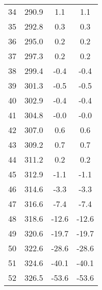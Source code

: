 \begin{tabular}{S[table-format=2.0]S[table-format=3.1]S[table-format=2.1]S[table-format=2.1]}
		34 & 290.9 & 1.1 & 1.1 \\
		35 & 292.8 & 0.3 & 0.3 \\
		36 & 295.0 & 0.2 & 0.2 \\
		37 & 297.3 & 0.2 & 0.2 \\
		38 & 299.4 & -0.4 & -0.4 \\
		39 & 301.3 & -0.5 & -0.5 \\
		40 & 302.9 & -0.4 & -0.4 \\
		41 & 304.8 & -0.0 & -0.0 \\
		42 & 307.0 & 0.6 & 0.6 \\
		43 & 309.2 & 0.7 & 0.7 \\
		44 & 311.2 & 0.2 & 0.2 \\
		45 & 312.9 & -1.1 & -1.1 \\
		46 & 314.6 & -3.3 & -3.3 \\
		47 & 316.6 & -7.4 & -7.4 \\
		48 & 318.6 & -12.6 & -12.6 \\
		49 & 320.6 & -19.7 & -19.7 \\
		50 & 322.6 & -28.6 & -28.6 \\
		51 & 324.6 & -40.1 & -40.1 \\
		52 & 326.5 & -53.6 & -53.6 \\
		\bottomrule
	\end{tabular}
